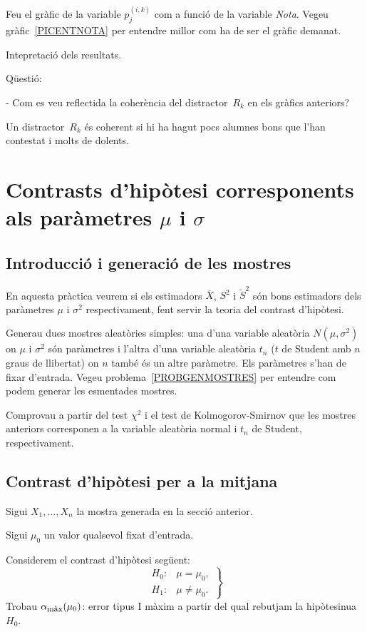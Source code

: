 Feu el gr\`afic de la variable $p_j^{(i,k)}$ com a funci\'o de la variable
{\it Nota}. Vegeu gr\`afic~\ref{PICENTNOTA} per entendre millor com
ha de ser el gr\`afic demanat.

Intepretaci\'o dels resultats.

Q\"uesti\'o:

- Com es veu reflectida la coher\`encia del distractor~$R_k$ en els gr\`afics
anteriors? 

Un distractor~$R_k$ \'es coherent si hi ha hagut pocs alumnes bons que
l'han contestat i molts de dolents.

\section{Contrasts d'hip\`otesi corresponents als
par\`ametres $\mu$ i $\sigma$}


\subsection{Introducci\'o i generaci\'o de les mostres}

En aquesta pr\`actica veurem si els estimadors 
$\overline{X}$, $S^2$ i $\tilde{S}^2$ s\'on bons estimadors
 dels par\`ametres 
$\mu$ i $\sigma^2$ respectivament, fent servir la teoria del contrast
 d'hip\`otesi.

Generau dues mostres 
aleat\`ories simples: una d'una variable aleat\`oria 
$N(\mu,\sigma^2)$ on $\mu$ i $\sigma^2$ s\'on par\`ametres
 i l'altra d'una variable aleat\`oria $t_n$ 
($t$ de Student amb $n$ graus de llibertat) on 
$n$ tamb\'e \'es un altre par\`ametre. 
Els par\`ametres s'han de
fixar d'entrada. Vegeu problema~\ref{PROBGENMOSTRES} per entendre com podem generar
les esmentades mostres.

Comprovau a partir del test $\chi^2$ i el test de Kolmogorov-Smirnov
que les mostres anteriors corresponen a la variable 
aleat\`oria normal i $t_n$ de Student, respectivament.

\subsection{Contrast d'hip\`otesi per a la mitjana}

Sigui $X_1,\ldots,X_n$ la mostra generada en la secci\'o anterior.

Sigui $\mu_0$ un valor qualsevol fixat d'entrada.

Considerem el contrast d'hip\`otesi seg\"uent:
\[
\left.
\begin{array}{ll}
H_0:&\mu =\mu_0, \\
H_1:&\mu\not =\mu_0.
\end{array}
\right\}
\]
Trobau $\alpha_{\mbox{\footnotesize m\`ax}}(\mu_0)$: error tipus 
I m\`axim a partir del qual rebutjam la hip\`otesi\break nu{\lgem}a~$H_0$.

